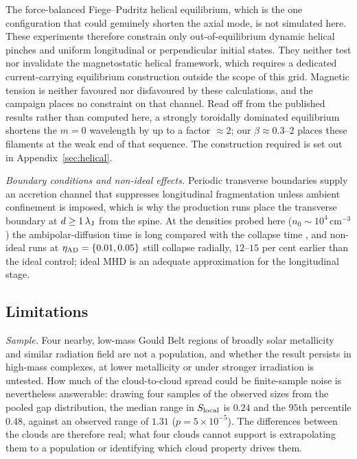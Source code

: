 \documentclass[usenatbib,twoside,twocolumn]{mnras}
\begin{document}
The force-balanced Fiege--Pudritz helical equilibrium, which is the one configuration that could genuinely shorten the axial mode, is not simulated here. These experiments therefore constrain only out-of-equilibrium dynamic helical pinches and uniform longitudinal or perpendicular initial states. They neither test nor invalidate the magnetostatic helical framework, which requires a dedicated current-carrying equilibrium construction outside the scope of this grid. Magnetic tension is neither favoured nor disfavoured by these calculations, and the campaign places no constraint on that channel. Read off from the published \citet{Fiege2000} results rather than computed here, a strongly toroidally dominated equilibrium shortens the $m=0$ wavelength by up to a factor $\approx2$; our $\beta\approx0.3$--$2$ places these filaments at the weak end of that sequence. The construction required is set out in Appendix~\ref{sec:helical}.

\emph{Boundary conditions and non-ideal effects.} Periodic transverse boundaries supply an accretion channel that suppresses longitudinal fragmentation unless ambient confinement is imposed, which is why the production runs place the transverse boundary at $d\geq1\,\lambda_{\rm J}$ from the spine. At the densities probed here ($n_0\sim10^4$\,cm$^{-3}$) the ambipolar-diffusion time is long compared with the collapse time \citep{Tassis2004}, and non-ideal runs at $\eta_{\rm AD}=\{0.01,0.05\}$ still collapse radially, $12$--$15$ per cent earlier than the ideal control; ideal MHD is an adequate approximation for the longitudinal stage.



\subsection{Limitations}
\label{sec:limitations}

\emph{Sample.} Four nearby, low-mass Gould Belt regions of broadly solar metallicity and similar radiation field are not a population, and whether the result persists in high-mass complexes, at lower metallicity or under stronger irradiation is untested. How much of the cloud-to-cloud spread could be finite-sample noise is nevertheless answerable: drawing four samples of the observed sizes from the pooled gap distribution, the median range in $S_{\rm local}$ is $0.24$ and the $95$th percentile $0.48$, against an observed range of $1.31$ ($p=5\times10^{-5}$). The differences between the clouds are therefore real; what four clouds cannot support is extrapolating them to a population or identifying which cloud property drives them.
\end{document}
